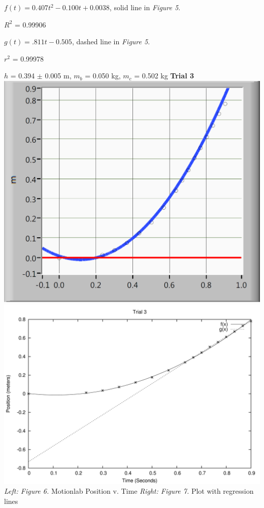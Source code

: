 \documentclass[12pt,letterpaper]{article}
\begin{document}
\(f(t) = 0.407t^2 - 0.100t + 0.0038\), solid line in \textit{Figure 5}.

\(R^2\) = 0.99906

\(g(t) = .811t - 0.505\), dashed line in \textit{Figure 5}.

\(r^2\) = 0.99978

\(h\) = 0.394 \(\pm\) 0.005 m, \(m_b\) = 0.050 kg, \(m_c\) = 0.502 kg
\newline\newline
\textbf{Trial 3}
\newline\newline
\includegraphics[scale=0.43]{t3p.PNG}
\includegraphics[scale=0.7]{3.png}
\textit{Left: Figure 6.} Motionlab Position v. Time  \textit{Right: Figure 7.} Plot with regression lines
\newline
\end{document}
